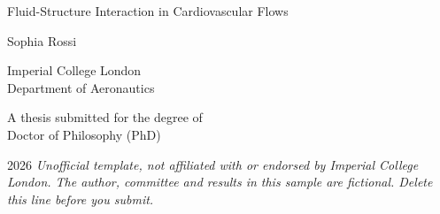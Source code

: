 \begin{titlepage}
\centering
\vspace*{1.2in}
{\LARGE Fluid-Structure Interaction in Cardiovascular Flows\par}
\vspace{0.8in}
{\large Sophia Rossi\par}
\vspace{1.2in}
Imperial College London\\
Department of Aeronautics\par
\vspace{0.6in}
A thesis submitted for the degree of\\
Doctor of Philosophy (PhD)\par
\vspace{0.4in}
2026
\vfill
{\footnotesize\itshape Unofficial template, not affiliated with or endorsed by Imperial College London. The author, committee and results in this sample are fictional. Delete this line before you submit.}
\end{titlepage}
